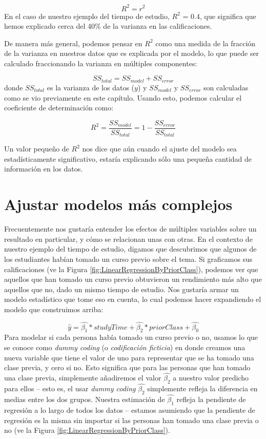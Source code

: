 \documentclass[
  12pt,
]{book}
\theoremstyle{definition}
\theoremstyle{definition}
\theoremstyle{definition}
\theoremstyle{remark}
\begin{document}
\[
R^2 = r^2
\]
En el caso de nuestro ejemplo del tiempo de estudio, \(R^2\) = 0.4, que significa que hemos explicado cerca del 40\% de la varianza en las calificaciones.

De manera más general, podemos pensar en \(R^2\) como una medida de la fracción de la varianza en nuestros datos que es explicada por el modelo, lo que puede ser calculado fraccionando la varianza en múltiples componentes:

\[
SS_{total} = SS_{model} + SS_{error}
\]
donde \(SS_{total}\) es la varianza de los datos (\(y\)) y \(SS_{model}\) y \(SS_{error}\) son calculadas como se vio previamente en este capítulo. Usando esto, podemos calcular el coeficiente de determinación como:

\[
R^2 = \frac{SS_{model}}{SS_{total}} = 1 - \frac{SS_{error}}{SS_{total}}
\]

Un valor pequeño de \(R^2\) nos dice que aún cuando el ajuste del modelo sea estadísticamente significativo, estaría explicando sólo una pequeña cantidad de información en los datos.

\hypertarget{ajustar-modelos-muxe1s-complejos}{%
\section{Ajustar modelos más complejos}\label{ajustar-modelos-muxe1s-complejos}}

Frecuentemente nos gustaría entender los efectos de múltiples variables sobre un resultado en particular, y cómo se relacionan unas con otras. En el contexto de nuestro ejemplo del tiempo de estudio, digamos que descubrimos que algunos de los estudiantes habían tomado un curso previo sobre el tema. Si graficamos sus calificaciones (ve la Figura \ref{fig:LinearRegressionByPriorClass}), podemos ver que aquellos que han tomado un curso previo obtuvieron un rendimiento más alto que aquellos que no, dado un mismo tiempo de estudio. Nos gustaría armar un modelo estadístico que tome eso en cuenta, lo cual podemos hacer expandiendo el modelo que construimos arriba:

\[
\hat{y} = \hat{\beta_1}*studyTime + \hat{\beta_2}*priorClass + \hat{\beta_0}
\]
Para modelar si cada persona había tomado un curso previo o no, usamos lo que se conoce como \emph{dummy coding} (o \emph{codificación ficticia}) en donde creamos una nueva variable que tiene el valor de uno para representar que se ha tomado una clase previa, y cero si no. Esto significa que para las personas que han tomado una clase previa, simplemente añadiremos el valor \(\hat{\beta_2}\) a nuestro valor predicho para ellos -- esto es, el usar \emph{dummy coding} \(\hat{\beta_2}\) simplemente refleja la diferencia en medias entre los dos grupos. Nuestra estimación de \(\hat{\beta_1}\) refleja la pendiente de regresión a lo largo de todos los datos -- estamos asumiendo que la pendiente de regresión es la misma sin importar si las personas han tomado una clase previa o no (ve la Figura \ref{fig:LinearRegressionByPriorClass}).
\end{document}
